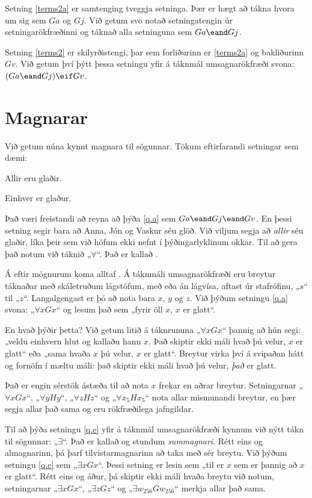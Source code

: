 Setning \ref{terms2a} er samtenging tveggja setninga. Þær er hægt að tákna hvora um sig sem $Ga$ og $Gj$. Við getum svo notað setningatengin úr setningarökfræðinni og táknað alla setninguna sem $Ga \eand Gj$.

Setning \ref{terms2} er skilyrðistengi, þar sem forliðurinn er \ref{terms2a} og bakliðurinn $Gv$. Við getum því þýtt þessa setningu yfir á táknmál umsagnarökfræði svona: $(Ga \eand Gj) \eif Gv$.

\section{Magnarar}
Við getum núna kynnt magnara til sögunnar. Tökum eftirfarandi setningar sem dæmi:

	\begin{earg}
		\item[\ex{q.a}] Allir eru glaðir.
		\item[\ex{q.e}] Einhver er glaður.
	\end{earg}
Það væri freistandi að reyna að þýða \ref{q.a} sem $Ga \eand Gj \eand Gv$. En þessi setning segir bara að Anna, Jón og Vaskur séu glöð. Við viljum segja að \emph{allir} séu glaðir, líka þeir sem við höfum ekki nefnt í þýðingarlyklinum okkar. Til að gera það notum við táknið „$\forall$“. Það er kallað . 
	
Á eftir mögnurum koma alltaf . Á táknmáli umsagnarökfræði eru breytur táknaðar með skáletruðum lágstöfum, með eða án lágvísa, aftast úr stafrófinu, „$s$“ til „$z$“. Langalgengast er þó að nota bara $x$, $y$ og $z$. Við þýðum setningu \ref{q.a} svona: „$\forall x Gx$“ og lesum það sem „fyrir öll $x$, $x$ er glatt“.

En hvað þýðir þetta? Við getum litið á táknrununa „$\forall xGx$“ þannig að hún segi: „veldu einhvern hlut og kallaðu hann $x$. Það skiptir ekki máli hvað þú velur, $x$ er glatt“ eða „sama hvaða $x$ þú velur, $x$ er glatt“. Breytur virka því á svipaðan hátt og fornöfn í mæltu máli: það skiptir ekki máli hvað þú velur, \emph{það} er glatt. 

Það er engin sérstök ástæða til að nota $x$ frekar en aðrar breytur. Setningarnar „$\forall x Gx$“, „$\forall y Hy$“, „$\forall z Hz$“ og „$\forall x_5 Hx_5$“ nota allar mismunandi breytur, en þær segja allar það sama og eru rökfræðilega jafngildar.

Til að þýða setningu \ref{q.e} yfir á táknmál umsagnarökfræði kynnum við nýtt tákn til sögunnar: „$\exists$“. Það er kallað  og stundum \emph{summagnari}. Rétt eins og almagnarinn, þá þarf tilvistarmagnarinn að taka með sér breytu. Við þýðum setningu \ref{q.e} sem „$\exists x Gx$“. Þessi setning er lesin sem „til er $x$ sem er þannig að $x$ er glatt“. Rétt eins og áður, þá skiptir ekki máli hvaða breytu við notum, setningarnar „$\exists x Gx$“, „$\exists z Gz$“ og „$\exists w_{256} Gw_{256}$“ merkja allar það sama.

